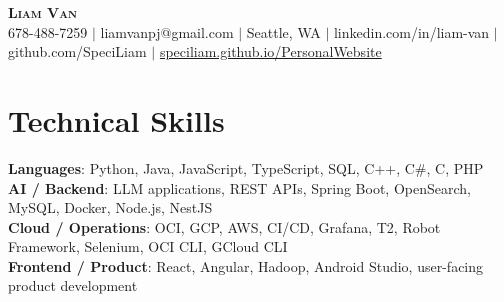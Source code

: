 \documentclass[letterpaper,11pt]{article}
\begin{document}

%
\begin{center}
    \textbf{\Huge \scshape Liam Van} \\ \vspace{1pt}
    \small 678-488-7259 $|$ \small {liamvanpj@gmail.com} $|$ Seattle, WA
 {{$|$ linkedin.com/in/liam-van} {$|$ github.com/SpeciLiam} {$|$ \href{https://speciliam.github.io/PersonalWebsite}{speciliam.github.io/PersonalWebsite}}}

\end{center}

\section{Technical Skills}
 \begin{itemize}[leftmargin=0.15in, label={}]
    \small{\item{
     \textbf{Languages}{: Python, Java, JavaScript, TypeScript, SQL, C++, C\#, C, PHP} \\
     \textbf{AI / Backend}{: LLM applications, REST APIs, Spring Boot, OpenSearch, MySQL, Docker, Node.js, NestJS} \\
     \textbf{Cloud / Operations}{: OCI, GCP, AWS, CI/CD, Grafana, T2, Robot Framework, Selenium, OCI CLI, GCloud CLI} \\
     \textbf{Frontend / Product}{: React, Angular, Hadoop, Android Studio, user-facing product development} \\
    }}
 \end{itemize}
%
\end{document}
